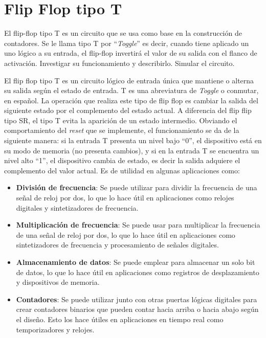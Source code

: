 \section{Flip Flop tipo T \label{sec:s2}}

\begin{center}
	\begin{minipage}{12cm}
		\begin{tcolorbox}[title=Actividad 2]
			El flip-flop tipo T es un circuito que se usa como base en la construcción de contadores. Se le llama tipo T por “\textit{Toggle}” es decir, cuando tiene aplicado un uno lógico a su entrada, el flip-flop invertirá el valor de su salida con el flanco de activación. Investigar su funcionamiento y describirlo. Simular el circuito.
		\end{tcolorbox}	
	\end{minipage}
\end{center}

El flip flop tipo T es un circuito lógico de entrada única que mantiene o alterna su salida según el estado de entrada. T es una abreviatura de \textit{Toggle} o conmutar, en español. La operación que realiza este tipo de flip flop es cambiar la salida del siguiente estado por el complemento del estado actual. A diferencia del flip flip tipo SR, el tipo T evita la aparición de un estado intermedio.\cite{oemsecrets_2021} Obviando el comportamiento del \textit{reset} que se implemente, el funcionamiento se da de la siguiente manera: si la entrada T presenta un nivel bajo ``0'', el dispositivo está en su modo de memoria (no presenta cambios), y si en la entrada T se encuentra un nivel alto ``1'', el dispositivo cambia de estado, es decir la salida adquiere el complemento del valor actual.\cite{Olmo} Es de utilidad en algunas aplicaciones como:

\begin{itemize}
	\item \textbf{División de frecuencia}: Se puede utilizar para dividir la frecuencia de una señal de reloj por dos, lo que lo hace útil en aplicaciones como relojes digitales y sintetizadores de frecuencia.
	\item \textbf{Multiplicación de frecuencia}: Se puede usar para multiplicar la frecuencia de una señal de reloj por dos, lo que lo hace útil en aplicaciones como sintetizadores de frecuencia y procesamiento de señales digitales.
	\item \textbf{Almacenamiento de datos}: Se puede emplear para almacenar un solo bit de datos, lo que lo hace útil en aplicaciones como registros de desplazamiento y dispositivos de memoria.
	\item \textbf{Contadores}: Se puede utilizar junto con otras puertas lógicas digitales para crear contadores binarios que pueden contar hacia arriba o hacia abajo según el diseño. Esto los hace útiles en aplicaciones en tiempo real como temporizadores y relojes. \cite{Anónimo_2023}
\end{itemize}

